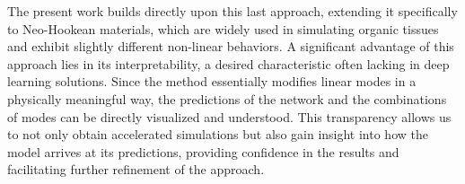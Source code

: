 The present work builds directly upon this last approach, extending it specifically to Neo-Hookean materials, which are widely used in simulating organic tissues and exhibit slightly different non-linear behaviors. A significant advantage of this approach lies in its interpretability, a desired characteristic often lacking in deep learning solutions. Since the method essentially modifies linear modes in a physically meaningful way, the predictions of the network and the combinations of modes can be directly visualized and understood. This transparency allows us to not only obtain accelerated simulations but also gain insight into how the model arrives at its predictions, providing confidence in the results and facilitating further refinement of the approach. 